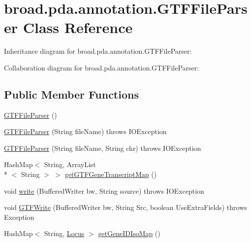 \hypertarget{classbroad_1_1pda_1_1annotation_1_1_g_t_f_file_parser}{\section{broad.\+pda.\+annotation.\+G\+T\+F\+File\+Parser Class Reference}
\label{classbroad_1_1pda_1_1annotation_1_1_g_t_f_file_parser}
}


Inheritance diagram for broad.\+pda.\+annotation.\+G\+T\+F\+File\+Parser\+:


Collaboration diagram for broad.\+pda.\+annotation.\+G\+T\+F\+File\+Parser\+:
\subsection*{Public Member Functions}
\begin{DoxyCompactItemize}
\item 
\hyperlink{classbroad_1_1pda_1_1annotation_1_1_g_t_f_file_parser_aa075326f19462c9810fcf619f87390bd}{G\+T\+F\+File\+Parser} ()
\item 
\hyperlink{classbroad_1_1pda_1_1annotation_1_1_g_t_f_file_parser_a142be3e45d0e66cde78cf4f5f2dd0f62}{G\+T\+F\+File\+Parser} (String file\+Name)  throws I\+O\+Exception 
\item 
\hyperlink{classbroad_1_1pda_1_1annotation_1_1_g_t_f_file_parser_ad7c1c37bdcabfd1b844a652ac2b99899}{G\+T\+F\+File\+Parser} (String file\+Name, String chr)  throws I\+O\+Exception 
\item 
Hash\+Map$<$ String, Array\+List\\*
$<$ String $>$ $>$ \hyperlink{classbroad_1_1pda_1_1annotation_1_1_g_t_f_file_parser_a70ad696e47d527d952c764208d0afc0d}{get\+G\+T\+F\+Gene\+Transcript\+Map} ()
\item 
void \hyperlink{classbroad_1_1pda_1_1annotation_1_1_g_t_f_file_parser_acebb6941060051342ee18e0a76ad0c03}{write} (Buffered\+Writer bw, String source)  throws I\+O\+Exception 
\item 
void \hyperlink{classbroad_1_1pda_1_1annotation_1_1_g_t_f_file_parser_a6cf2e37db633eac20b4ff4eeb39f965c}{G\+T\+F\+Write} (Buffered\+Writer bw, String Src, boolean Use\+Extra\+Fields)  throws Exception 
\item 
Hash\+Map$<$ String, \hyperlink{classbroad_1_1pda_1_1annotation_1_1_locus}{Locus} $>$ \hyperlink{classbroad_1_1pda_1_1annotation_1_1_g_t_f_file_parser_ab209c5c9823b5dfefa59299591ea7781}{get\+Gene\+I\+D\+Iso\+Map} ()
\end{DoxyCompactItemize}
